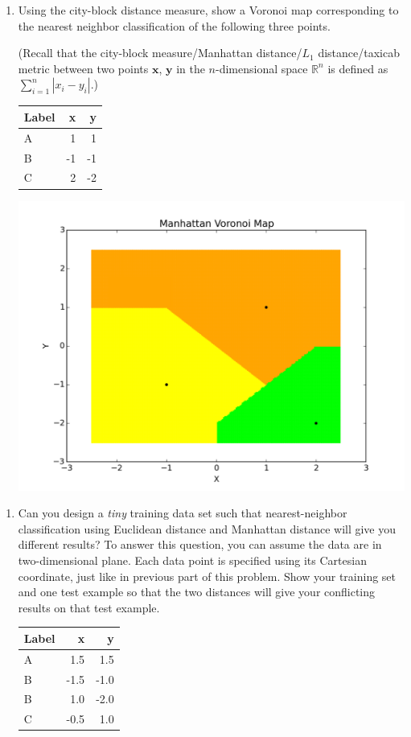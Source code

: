 \documentclass[listings, listings-bw, listings-color, listings-sv]{article}
\begin{document}
\begin{enumerate}
\item Using the city-block distance measure, show a Voronoi map corresponding to the nearest neighbor classification of the following three points.

(Recall that the city-block measure/Manhattan distance/$L_{1}$ distance/taxicab metric between two points ${\mathbf x}$, ${\mathbf y}$ in the $n$-dimensional space $\mathbb{R}^{n}$ is defined as $\sum_{i=1}^{n}\left| x_{i}-y_{i}\right|$.)

\begin{center}
\begin{tabular}{lrr}
\hline
Label & x & y\\
\hline
A & 1 & 1\\
B & -1 & -1\\
C & 2 & -2\\
\hline
\end{tabular}
\end{center}

\includegraphics[height=8 cm \centering]{./images/NN_3b.png}
\end{enumerate}


\begin{enumerate}
\item Can you design a \emph{tiny} training data set such that nearest-neighbor classification using Euclidean distance and Manhattan distance will give you different results? To answer this question, you can assume the data are in two-dimensional plane. Each data point is specified using its Cartesian coordinate, just like in previous part of this problem.  Show your training set and one test example so that the two distances will give your conflicting results on that test example.

\begin{center}
\begin{tabular}{lrr}
\hline
Label & x & y\\
\hline
A & 1.5 & 1.5\\
B & -1.5 & -1.0\\
B & 1.0 & -2.0\\
C & -0.5 & 1.0\\
\hline
\end{tabular}
\end{center}
\end{enumerate}
\end{document}
